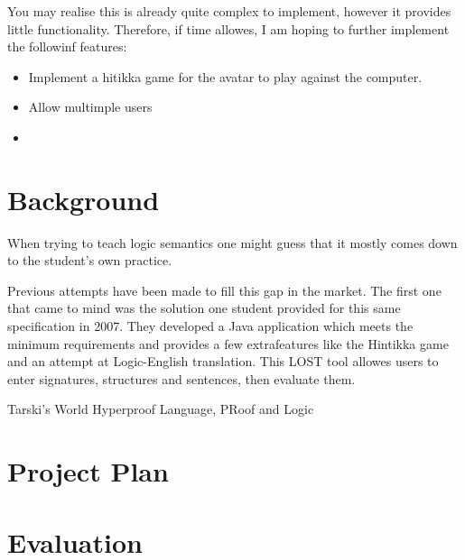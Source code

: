 \documentclass{article}
\begin{document}
You may realise this is already quite complex to implement, however it provides little functionality. Therefore, if time allowes, I am hoping to further implement the followinf features:
\begin{itemize}
	\item Implement a hitikka game for the avatar to play against the computer.
	\item Allow multimple users
	\item 


\end{itemize}


\section{Background}		%
	When trying to teach logic semantics one might guess that it mostly comes down to the student's own practice. 

	Previous attempts have been made to fill this gap in the market. The first one that came to mind was the solution one student provided for this same specification in 2007. They developed a Java application which meets the minimum requirements and provides a few extrafeatures like the Hintikka game and an attempt at Logic-English translation. This LOST tool allowes users to enter signatures, structures and sentences, then evaluate them.

	Tarski's World
	Hyperproof
	Language, PRoof and Logic



\section{Project Plan}		%

\section{Evaluation}		%
\end{document}
